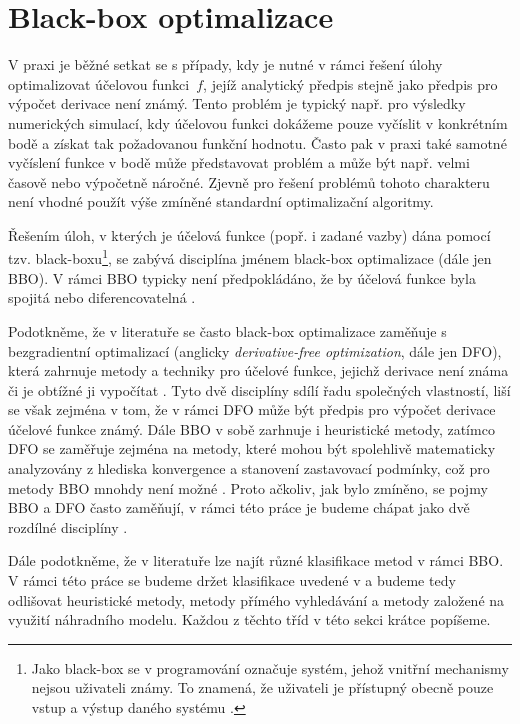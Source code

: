\section{Black-box optimalizace}\label{black-box}
V praxi je běžné setkat se s případy, kdy je nutné v rámci řešení úlohy optimalizovat účelovou funkci~$ f $, jejíž analytický předpis stejně jako předpis pro výpočet derivace není známý. Tento problém je typický např. pro výsledky numerických simulací, kdy účelovou funkci dokážeme pouze vyčíslit v konkrétním bodě a získat tak požadovanou funkční hodnotu. Často pak v praxi také samotné vyčíslení funkce v bodě může představovat problém a může být např. velmi časově nebo výpočetně náročné. Zjevně pro řešení problémů tohoto charakteru není vhodné použít výše zmíněné standardní optimalizační algoritmy.

Řešením úloh, v kterých je účelová funkce (popř. i zadané vazby) dána pomocí tzv. black-boxu\footnote{Jako black-box se v programování označuje systém, jehož vnitřní mechanismy nejsou uživateli známy. To znamená, že uživateli je přístupný obecně pouze vstup a výstup daného systému \cite{BBO-textbook}.}, se zabývá disciplína jménem black-box optimalizace (dále jen BBO). V rámci BBO typicky není předpokládáno, že by účelová funkce byla spojitá nebo diferencovatelná \cite{BBO-textbook, derivative-free-review, two-decades}.

Podotkněme, že v literatuře se často black-box optimalizace zaměňuje s bezgradientní optimalizací (anglicky \textit{derivative-free optimization}, dále jen DFO), která zahrnuje metody a techniky pro účelové funkce, jejichž derivace není známa či je obtížné ji vypočítat \cite{BBO-textbook, derivative-free-review, Kramer2011}. Tyto dvě disciplíny sdílí řadu společných vlastností, liší se však zejména v tom, že v rámci DFO může být předpis pro výpočet derivace účelové funkce známý. Dále BBO v sobě zarhnuje i heuristické metody, zatímco DFO se zaměřuje zejména na metody, které mohou být spolehlivě matematicky analyzovány z hlediska konvergence a stanovení zastavovací podmínky, což pro metody BBO mnohdy není možné \cite{BBO-textbook}. Proto ačkoliv, jak bylo zmíněno, se pojmy BBO a DFO často zaměňují, v rámci této práce je budeme chápat jako dvě rozdílné disciplíny \cite{BBO-textbook}.

Dále podotkněme, že v literatuře lze najít různé klasifikace metod v rámci BBO. V rámci této práce se budeme držet klasifikace uvedené v \cite{BBO-textbook} a budeme tedy odlišovat heuristické metody, metody přímého vyhledávání a metody založené na využití náhradního modelu. Každou z těchto tříd v této sekci krátce popíšeme.

